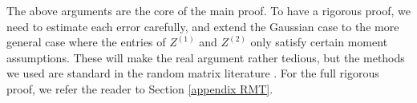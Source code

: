 %


The above arguments are the core of the main proof. To have a rigorous proof, we need to estimate each error carefully, and extend the Gaussian case to the more general case where the entries of $Z^{(1)}$ and $Z^{(2)}$ only satisfy certain moment assumptions. These will make the real argument rather tedious, but the methods we used are standard in the random matrix literature \cite{erdos2017dynamical,Anisotropic}. For the full rigorous proof, we refer the reader to Section \ref{appendix RMT}.

